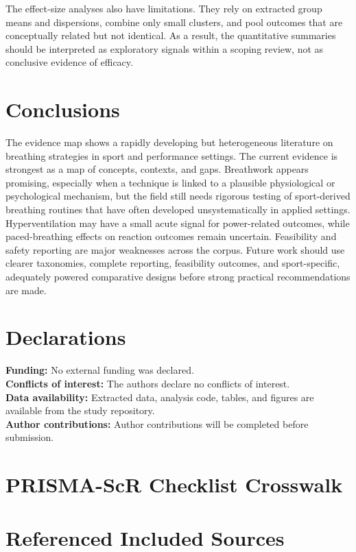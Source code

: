 \documentclass[11pt,a4paper]{article}
\begin{document}
The effect-size analyses also have limitations. They rely on extracted group means and dispersions, combine only small clusters, and pool outcomes that are conceptually related but not identical. As a result, the quantitative summaries should be interpreted as exploratory signals within a scoping review, not as conclusive evidence of efficacy.

\section{Conclusions}
The evidence map shows a rapidly developing but heterogeneous literature on breathing strategies in sport and performance settings. The current evidence is strongest as a map of concepts, contexts, and gaps. Breathwork appears promising, especially when a technique is linked to a plausible physiological or psychological mechanism, but the field still needs rigorous testing of sport-derived breathing routines that have often developed unsystematically in applied settings. Hyperventilation may have a small acute signal for power-related outcomes, while paced-breathing effects on reaction outcomes remain uncertain. Feasibility and safety reporting are major weaknesses across the corpus. Future work should use clearer taxonomies, complete reporting, feasibility outcomes, and sport-specific, adequately powered comparative designs before strong practical recommendations are made.

\section*{Declarations}
\textbf{Funding:} No external funding was declared.\\
\textbf{Conflicts of interest:} The authors declare no conflicts of interest.\\
\textbf{Data availability:} Extracted data, analysis code, tables, and figures are available from the study repository.\\
\textbf{Author contributions:} Author contributions will be completed before submission.

\appendix
\section{PRISMA-ScR Checklist Crosswalk}


\section{Referenced Included Sources}
\nocite{rayyan-164849052,rayyan-164849040,rayyan-164849036,rayyan-164848982,rayyan-164849000,rayyan-164848980,rayyan-164848972,rayyan-164848960,rayyan-164848964,rayyan-164848918,rayyan-587891674,rayyan-164848916,rayyan-164848919,rayyan-164848909,rayyan-164848882,rayyan-164848876,rayyan-164848862,rayyan-164848878,rayyan-164848880,rayyan-164848859,rayyan-587869979,rayyan-587870003,rayyan-587869980,rayyan-587869976,rayyan-587869968,rayyan-587869999,rayyan-587870002,rayyan-587870000,rayyan-587870001,rayyan-587869988,rayyan-587869986}
\printbibliography
\end{document}
